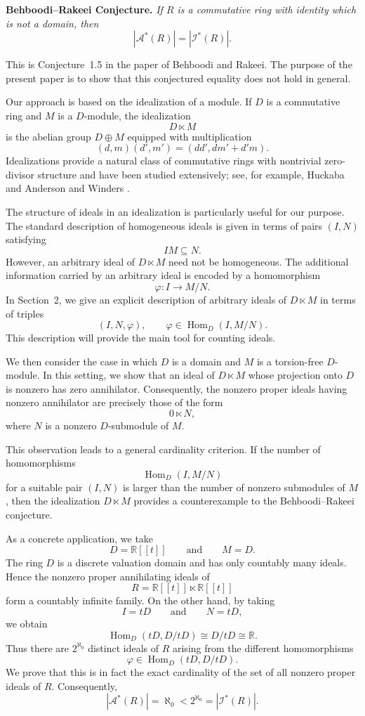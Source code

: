 \documentclass[11pt]{article}
\theoremstyle{definition}
\theoremstyle{remark}
\begin{document}
\medskip

\noindent
\textbf{Behboodi--Rakeei Conjecture.}
\emph{If $R$ is a commutative ring with identity which is not a
	domain, then}
\[
\boxed{
	|\mathcal A^*(R)|=|\mathcal I^*(R)|.
}
\]

\medskip

This is Conjecture~1.5 in the paper of Behboodi and Rakeei. The
purpose of the present paper is to show that this conjectured equality
does not hold in general.

Our approach is based on the idealization of a module. If $D$ is a
commutative ring and $M$ is a $D$-module, the idealization
\[
D\ltimes M
\]
is the abelian group $D\oplus M$ equipped with multiplication
\[
(d,m)(d',m')
=
(dd',dm'+d'm).
\]
Idealizations provide a natural class of commutative rings with
nontrivial zero-divisor structure and have been studied extensively;
see, for example, Huckaba \cite{Huckaba} and Anderson and Winders
\cite{AndersonWinders}.

The structure of ideals in an idealization is particularly useful for
our purpose. The standard description of homogeneous ideals is given
in terms of pairs $(I,N)$ satisfying
\[
IM\subseteq N.
\]
However, an arbitrary ideal of $D\ltimes M$ need not be homogeneous.
The additional information carried by an arbitrary ideal is encoded
by a homomorphism
\[
\varphi:I\longrightarrow M/N.
\]
In Section~2, we give an explicit description of arbitrary ideals of
$D\ltimes M$ in terms of triples
\[
(I,N,\varphi),
\qquad
\varphi\in\operatorname{Hom}_D(I,M/N).
\]
This description will provide the main tool for counting ideals.

We then consider the case in which $D$ is a domain and $M$ is a
torsion-free $D$-module. In this setting, we show that an ideal of
$D\ltimes M$ whose projection onto $D$ is nonzero has zero
annihilator. Consequently, the nonzero proper ideals having nonzero
annihilator are precisely those of the form
\[
0\ltimes N,
\]
where $N$ is a nonzero $D$-submodule of $M$.

This observation leads to a general cardinality criterion. If the
number of homomorphisms
\[
\operatorname{Hom}_D(I,M/N)
\]
for a suitable pair $(I,N)$ is larger than the number of nonzero
submodules of $M$, then the idealization $D\ltimes M$ provides a
counterexample to the Behboodi--Rakeei conjecture.

As a concrete application, we take
\[
D=\mathbb R[[t]]
\qquad\text{and}\qquad
M=D.
\]
The ring $D$ is a discrete valuation domain and has only countably
many ideals. Hence the nonzero proper annihilating ideals of
\[
R=\mathbb R[[t]]\ltimes\mathbb R[[t]]
\]
form a countably infinite family. On the other hand, by taking
\[
I=tD
\qquad\text{and}\qquad
N=tD,
\]
we obtain
\[
\operatorname{Hom}_D(tD,D/tD)
\cong D/tD
\cong\mathbb R.
\]
Thus there are $2^{\aleph_0}$ distinct ideals of $R$ arising from the
different homomorphisms
\[
\varphi\in\operatorname{Hom}_D(tD,D/tD).
\]
We prove that this is in fact the exact cardinality of the set of all
nonzero proper ideals of $R$. Consequently,
\[
|\mathcal A^*(R)|=\aleph_0
<
2^{\aleph_0}
=
|\mathcal I^*(R)|.
\]
\end{document}
